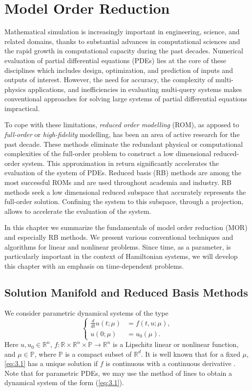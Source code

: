 \chapter{Model Order Reduction} \label{chapter:3}
Mathematical simulation is increasingly important in engineering, science, and related domains, thanks to substantial advances in computational sciences and the rapid growth in computational capacity during the past decades. Numerical evaluation of partial differential equations (PDEs) lies at the core of these disciplines which includes design, optimization, and prediction of inputs and outputs of interest. However, the need for accuracy, the complexity of multi-physics applications, and inefficiencies in evaluating multi-query systems makes conventional approaches for solving large systems of partial differential equations impractical. 

To cope with these limitations, \emph{reduced order modelling} (ROM), as apposed to \emph{full-order} or \emph{high-fidelity} modelling, has been an area of active research for the past decade. These methods eliminate the redundant physical or computational complexities of the full-order problem to construct a low dimensional reduced-order system. This approximation in return significantly accelerates the evaluation of the system of PDEs. Reduced basis (RB) methods are among the most successful ROMs and are used throughout academia and industry. RB methods seek a low dimensional reduced subspace that accurately represents the full-order solution. Confining the system to this subspace, through a projection, allows to accelerate the evaluation of the system.

In this chapter we summarize the fundamentals of model order reduction (MOR) and especially RB methods. We present various conventional techniques and algorithms for linear and nonlinear problems. Since time, as a parameter, is particularly important in the context of Hamiltonian systems, we will develop this chapter with an emphasis on time-dependent problems.

\section{Solution Manifold and Reduced Basis Methods} \label{sec:3.1}
We consider parametric dynamical systems of the type
\begin{equation} \label{eq:3.1}
\left\{
\begin{aligned}
	\frac d{dt} u(t;\mu) &= f(t,u;\mu),\\
	u(0;\mu) &= u_0(\mu).
\end{aligned}
\right.
\end{equation}
Here $u,u_0\in \mathbb R^{n}$, $f:\mathbb R \times \mathbb R^{n} \times \mathbb P\to \mathbb R^{n}$ is a Lipschitz linear or nonlinear function, and $\mu \in \mathbb P$, where $\mathbb P$ is a compact subset of $\mathbb R^d$. It is well known that for a fixed $\mu$, \eqref{eq:3.1} has a unique solution if $f$ is continuous with a continuous derivative \cite{rudin1976principles}. Note that for parametric PDEs, we may use the method of lines \cite{edsberg2015introduction} to obtain a dynamical system of the form (\ref{eq:3.1}).

